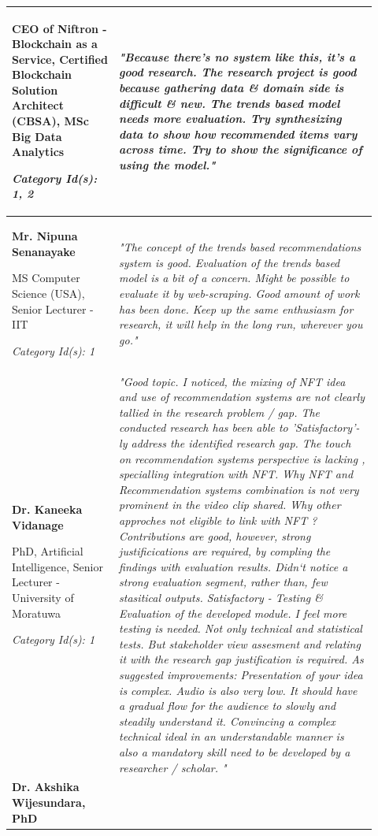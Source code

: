 \begin{longtable}{|p{0.27\linewidth}|p{0.655\linewidth}|}
CEO of Niftron - Blockchain as a Service, Certified Blockchain Solution Architect (CBSA), MSc Big Data Analytics

\textit{Category Id(s): 1, 2}
&  
\textit{"Because there's no system like this, it's a good research. The research project is good because gathering data \& domain side is difficult \& new.
The trends based model needs more evaluation. Try synthesizing data to show how recommended items vary across time. Try to show the significance of using the model."}
\\
\hline
\textbf{Mr. Nipuna Senanayake} 

MS Computer Science (USA), Senior Lecturer - IIT

\textit{Category Id(s): 1}
& 
\textit{"The concept of the trends based recommendations system is good. Evaluation of the trends based model is a bit of a concern. Might be possible to evaluate it by web-scraping.
Good amount of work has been done. Keep up the same enthusiasm for research, it will help in the long run, wherever you go."}
 \\
\hline
\textbf{Dr. Kaneeka Vidanage}

PhD, Artificial Intelligence, Senior Lecturer - University of Moratuwa

\textit{Category Id(s): 1}
& 
\textit{"Good topic. I noticed, the mixing of NFT idea and use of recommendation systems are not clearly tallied in the research problem / gap.
The conducted research has been able to 'Satisfactory'-ly address the identified research gap. The touch on recommendation systems perspective is lacking , specialling integration with NFT.
Why NFT and Recommendation systems combination is not very prominent in the video clip shared. Why other approches not eligible to link with NFT ?
Contributions are good, however, strong justificications are required, by compling the findings with evaluation results. Didn`t notice a strong evaluation segment, rather than, few stasitical outputs.
Satisfactory - Testing \& Evaluation of the developed module. I feel more testing is needed. Not only technical and statistical tests. But stakeholder view assesment and relating it with the research gap justification is required.
As suggested improvements: Presentation of your idea is complex. Audio is also very low.  It should have a gradual flow for the audience to slowly and steadily understand it. Convincing a complex technical ideal in an understandable manner is also a mandatory skill need to be developed by a researcher / scholar. 
"}
\\
\hline
\textbf{Dr. Akshika Wijesundara, PhD}


\end{longtable}
